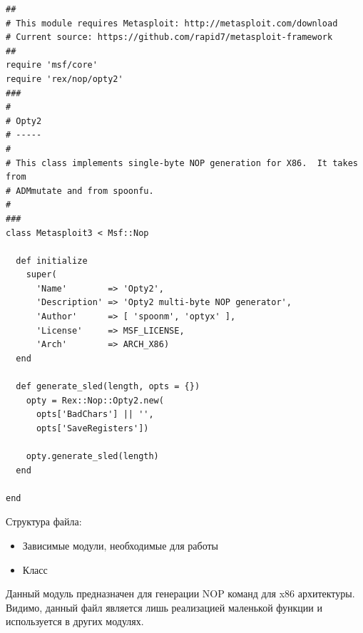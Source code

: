\documentclass[10pt,a4paper]{article}
\begin{document}
\begin{lstlisting}
##
# This module requires Metasploit: http://metasploit.com/download
# Current source: https://github.com/rapid7/metasploit-framework
##
require 'msf/core'
require 'rex/nop/opty2'
###
#
# Opty2
# -----
#
# This class implements single-byte NOP generation for X86.  It takes from
# ADMmutate and from spoonfu.
#
###
class Metasploit3 < Msf::Nop

  def initialize
    super(
      'Name'        => 'Opty2',
      'Description' => 'Opty2 multi-byte NOP generator',
      'Author'      => [ 'spoonm', 'optyx' ],
      'License'     => MSF_LICENSE,
      'Arch'        => ARCH_X86)
  end

  def generate_sled(length, opts = {})
    opty = Rex::Nop::Opty2.new(
      opts['BadChars'] || '',
      opts['SaveRegisters'])

    opty.generate_sled(length)
  end

end
\end{lstlisting}

Структура файла: 

\begin{itemize}
\item Зависимые модули, необходимые для работы
\item Класс
\end{itemize}

Данный модуль предназначен для генерации NOP команд для x86 архитектуры.\\
Видимо, данный файл является лишь реализацией маленькой функции и используется  в других модулях.
\end{document}
